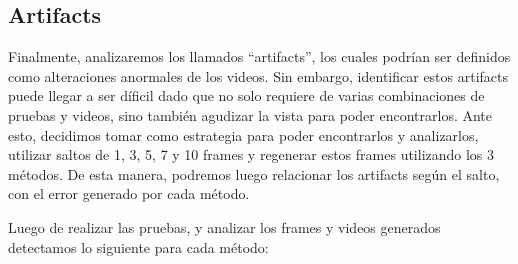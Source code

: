 \subsection{Artifacts}

Finalmente, analizaremos los llamados ``artifacts'', los cuales podr\'ian ser definidos como alteraciones anormales de los videos. Sin embargo, identificar estos artifacts puede llegar a ser d\'ificil dado que no solo requiere de varias combinaciones de pruebas y videos, sino tambi\'en agudizar la vista para poder encontrarlos. Ante esto, decidimos tomar como estrategia para poder encontrarlos y analizarlos, utilizar saltos de 1, 3, 5, 7 y 10 frames y regenerar estos frames utilizando los 3 m\'etodos. De esta manera, podremos luego relacionar los artifacts seg\'un el salto, con el error generado por cada m\'etodo.

Luego de realizar las pruebas, y analizar los frames y videos generados detectamos lo siguiente para cada m\'etodo:

